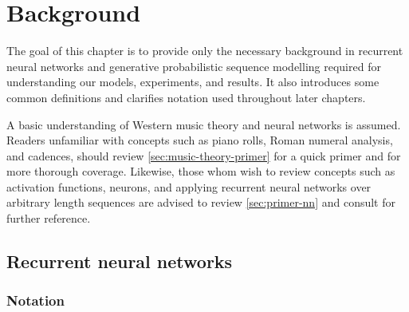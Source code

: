 \chapter{Background}

\ifpdf
    \graphicspath{{Chapter2/Figs/Raster/}{Chapter2/Figs/PDF/}{Chapter2/Figs/}}
\else
    \graphicspath{{Chapter2/Figs/Vector/}{Chapter2/Figs/}}
\fi

The goal of this chapter is to provide only the necessary background in
recurrent neural networks and generative probabilistic sequence modelling
required for understanding our models, experiments, and results. It also
introduces some common definitions and clarifies notation used throughout later chapters.

A basic understanding of Western music theory and neural networks is assumed.
Readers unfamiliar with concepts such as piano rolls, Roman numeral analysis,
and cadences, should review \vref{sec:music-theory-primer} for a quick primer
and \citet{piston1978harmony,denny1960oxford} for more thorough coverage.
Likewise, those whom wish to review concepts such as activation functions,
neurons, and applying recurrent neural networks over arbitrary length sequences
are advised to review \vref{sec:primer-nn} and consult
\citet{bengio2009learning} for further reference.

\section{Recurrent neural networks}\label{sec:bg-rnn}


\subsection{Notation}


